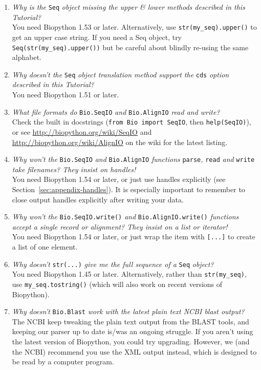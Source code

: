 \documentclass{report}
\begin{document}
\begin{enumerate}
  \item \emph{Why is the} \verb|Seq| \emph{object missing the upper \& lower methods described in this Tutorial?} \\
  You need Biopython 1.53 or later.  Alternatively, use \verb|str(my_seq).upper()| to get an upper case string.
  If you need a Seq object, try \verb|Seq(str(my_seq).upper())| but be careful about blindly re-using the same alphabet.
 
  \item \emph{Why doesn't the} \verb|Seq| \emph{object translation method support the} \verb|cds| \emph{option described in this Tutorial?} \\
  You need Biopython 1.51 or later.

  \item \emph{What file formats do} \verb|Bio.SeqIO| \emph{and} \verb|Bio.AlignIO| \emph{read and write?} \\
  Check the built in docstrings (\texttt{from Bio import SeqIO}, then \texttt{help(SeqIO)}), or see \url{http://biopython.org/wiki/SeqIO} and \url{http://biopython.org/wiki/AlignIO} on the wiki for the latest listing.
  
  \item \emph{Why won't the } \verb|Bio.SeqIO| \emph{and} \verb|Bio.AlignIO| \emph{functions} \verb|parse|\emph{,} \verb|read| \emph{and} \verb|write| \emph{take filenames? They insist on handles!} \\
  You need Biopython 1.54 or later, or just use handles explicitly (see Section~\ref{sec:appendix-handles}).
  It is especially important to remember to close output handles explicitly after writing your data.

  \item \emph{Why won't the } \verb|Bio.SeqIO.write()| \emph{and} \verb|Bio.AlignIO.write()| \emph{functions accept a single record or alignment? They insist on a list or iterator!} \\
  You need Biopython 1.54 or later, or just wrap the item with \verb|[...]| to create a list of one element.

  \item \emph{Why doesn't} \verb|str(...)| \emph{give me the full sequence of a} \verb|Seq| \emph{object?} \\
  You need Biopython 1.45 or later.  Alternatively, rather than \verb|str(my_seq)|, use \verb|my_seq.tostring()| (which will also work on recent versions of Biopython).
  
  \item \emph{Why doesn't} \verb|Bio.Blast| \emph{work with the latest plain text NCBI blast output?} \\
  The NCBI keep tweaking the plain text output from the BLAST tools, and keeping our parser up to date is/was an ongoing struggle.
  If you aren't using the latest version of Biopython, you could try upgrading.
  However, we (and the NCBI) recommend you use the XML output instead, which is designed to be read by a computer program.


\end{enumerate}
\end{document}

